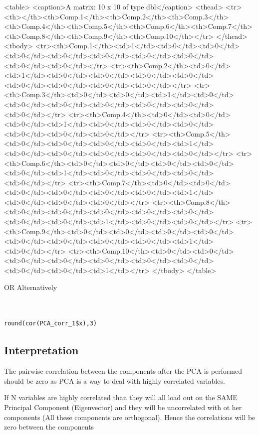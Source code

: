 \documentclass[a4paper,12pt]{article}
\begin{document}
<table>
<caption>A matrix: 10 x 10 of type dbl</caption>
<thead>
	<tr><th></th><th>Comp.1</th><th>Comp.2</th><th>Comp.3</th><th>Comp.4</th><th>Comp.5</th><th>Comp.6</th><th>Comp.7</th><th>Comp.8</th><th>Comp.9</th><th>Comp.10</th></tr>
</thead>
<tbody>
	<tr><th>Comp.1</th><td>1</td><td>0</td><td>0</td><td>0</td><td>0</td><td>0</td><td>0</td><td>0</td><td>0</td><td>0</td></tr>
	<tr><th>Comp.2</th><td>0</td><td>1</td><td>0</td><td>0</td><td>0</td><td>0</td><td>0</td><td>0</td><td>0</td><td>0</td></tr>
	<tr><th>Comp.3</th><td>0</td><td>0</td><td>1</td><td>0</td><td>0</td><td>0</td><td>0</td><td>0</td><td>0</td><td>0</td></tr>
	<tr><th>Comp.4</th><td>0</td><td>0</td><td>0</td><td>1</td><td>0</td><td>0</td><td>0</td><td>0</td><td>0</td><td>0</td></tr>
	<tr><th>Comp.5</th><td>0</td><td>0</td><td>0</td><td>0</td><td>1</td><td>0</td><td>0</td><td>0</td><td>0</td><td>0</td></tr>
	<tr><th>Comp.6</th><td>0</td><td>0</td><td>0</td><td>0</td><td>0</td><td>1</td><td>0</td><td>0</td><td>0</td><td>0</td></tr>
	<tr><th>Comp.7</th><td>0</td><td>0</td><td>0</td><td>0</td><td>0</td><td>0</td><td>1</td><td>0</td><td>0</td><td>0</td></tr>
	<tr><th>Comp.8</th><td>0</td><td>0</td><td>0</td><td>0</td><td>0</td><td>0</td><td>0</td><td>1</td><td>0</td><td>0</td></tr>
	<tr><th>Comp.9</th><td>0</td><td>0</td><td>0</td><td>0</td><td>0</td><td>0</td><td>0</td><td>0</td><td>1</td><td>0</td></tr>
	<tr><th>Comp.10</th><td>0</td><td>0</td><td>0</td><td>0</td><td>0</td><td>0</td><td>0</td><td>0</td><td>0</td><td>1</td></tr>
</tbody>
</table>




OR Alternatively



\begin{framed} \begin{verbatim}


round(cor(PCA_corr_1$x),3)
\end{verbatim}\end{framed} 

\newpage 
\subsection*{Interpretation}
The pairwise correlation between the components after the PCA is performed should be zero as PCA is a way to deal with highly correlated variables. 

If N variables are highly correlated than they will all load out on the SAME Principal Component (Eigenvector) and they will be uncorrelated with ot
her components (All these components are orthogonal). Hence the correlations will be zero between the components
\end{document}
